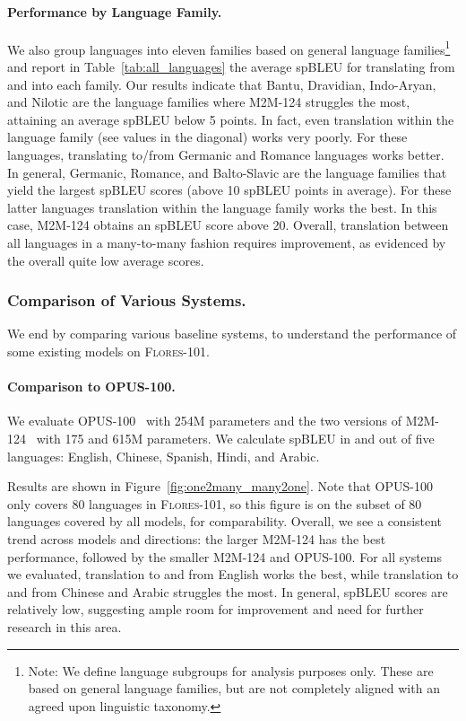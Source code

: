 \paragraph{Performance by Language Family.} We also group languages into eleven families based on general language families\footnote{Note: We define language subgroups for analysis purposes only. These are based on general language families, but are not completely aligned with an agreed upon linguistic taxonomy.} and report in Table~\ref{tab:all_languages} the average spBLEU for translating from and into each family. Our results indicate that Bantu, Dravidian, Indo-Aryan, and Nilotic are the language families where M2M-124 struggles the most, attaining an average spBLEU below 5 points. In fact, even translation within the language family (see values in the diagonal) works very poorly. For these languages, translating to/from Germanic and Romance languages works better. In general, Germanic, Romance, and Balto-Slavic are the language families that yield the largest spBLEU scores (above 10 spBLEU points in average). For these latter languages translation within the language family works the best. In this case, M2M-124 obtains an spBLEU score above 20. Overall, translation between all languages in a many-to-many fashion requires improvement, as evidenced by the overall quite low average scores. 

\subsubsection{Comparison of Various Systems.} 

We end by comparing various baseline systems, to understand the performance of some existing models on \textsc{Flores-101}.

\paragraph{Comparison to OPUS-100.} We evaluate OPUS-100~\cite{zhang-etal-2020-improving} with 254M parameters and the two versions of M2M-124~\cite{fan2020beyond} with 175 and 615M parameters. We calculate spBLEU in and out of five languages: English, Chinese, Spanish, Hindi, and Arabic.

Results are shown in Figure~\ref{fig:one2many_many2one}.
Note that OPUS-100 only covers 80 languages in \textsc{Flores-101}, so this figure is on the subset of 80 languages covered by all models, for comparability. Overall, we see a consistent trend across models and directions: the larger M2M-124 has the best performance, followed by the smaller M2M-124 and OPUS-100. For all systems we evaluated, translation to and from English works the best, while translation to and from Chinese and Arabic struggles the most. In general, spBLEU scores are relatively low, suggesting ample room for improvement and need for further research in this area.

